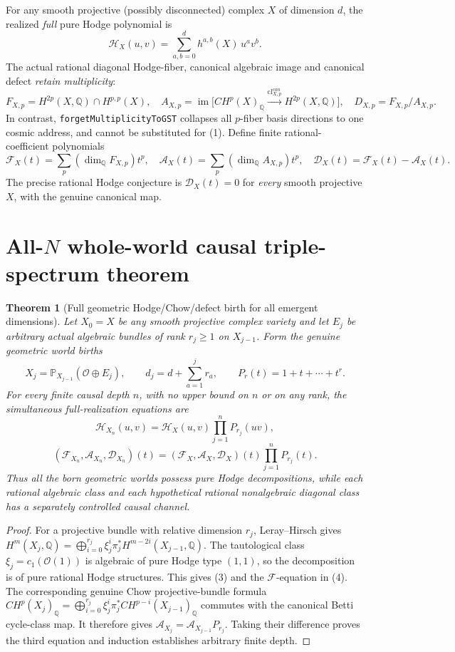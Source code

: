 \documentclass[11pt]{article}
\newtheorem{theorem}{Theorem}
\begin{document}
For any smooth projective (possibly disconnected) complex \(X\) of
dimension \(d\), the realized \emph{full} pure Hodge polynomial is
\[
 \mathcal H_X(u,v)=\sum_{a,b=0}^d h^{a,b}(X)\,u^av^b.
\]
The actual rational diagonal Hodge-fiber, canonical algebraic image
and canonical defect \emph{retain multiplicity}:
\[
 F_{X,p}=H^{2p}(X,\mathbb Q)\cap H^{p,p}(X),\quad
 A_{X,p}=\operatorname{im}\bigl[
 CH^p(X)_{\mathbb Q}\xrightarrow{\mathrm{cl}^{can}_{X,p}}
 H^{2p}(X,\mathbb Q)\bigr],\quad
 D_{X,p}=F_{X,p}/A_{X,p}.
 \tag{1}
\]
In contrast, \texttt{forgetMultiplicityToGST} collapses all \(p\)-fiber
basis directions to one cosmic address, and cannot be substituted for (1).
Define finite rational-coefficient polynomials
\[
 \mathcal F_X(t)=\sum_p(\dim_{\mathbb Q} F_{X,p})t^p,\quad
 \mathcal A_X(t)=\sum_p(\dim_{\mathbb Q} A_{X,p})t^p,\quad
 \mathcal D_X(t)=\mathcal F_X(t)-\mathcal A_X(t).
 \tag{2}
\]
The precise rational Hodge conjecture is \(\mathcal D_X(t)=0\) for
\emph{every} smooth projective \(X\), with the genuine canonical map.

\section{All-\(N\) whole-world causal triple-spectrum theorem}
\begin{theorem}[Full geometric Hodge/Chow/defect birth for all emergent dimensions]
Let \(X_0=X\) be any smooth projective complex variety and let
\(E_j\) be \emph{arbitrary actual algebraic} bundles of rank \(r_j\ge1\)
on \(X_{j-1}\). Form the genuine geometric world births
\[
 X_j=\mathbb P_{X_{j-1}}(\mathcal O\oplus E_j),
 \qquad d_j=d+\sum_{a=1}^jr_a,\qquad
 P_r(t)=1+t+\cdots+t^r.
\]
For every finite causal depth \(n\), with no upper bound on \(n\)
or on any rank, the \emph{simultaneous full-realization equations} are
\[
 \boxed{\mathcal H_{X_n}(u,v)=
       \mathcal H_X(u,v)\prod_{j=1}^n P_{r_j}(uv)},              \tag{3}
\]
\[
 \boxed{(\mathcal F_{X_n},\mathcal A_{X_n},\mathcal D_{X_n})(t)=
  (\mathcal F_X,\mathcal A_X,\mathcal D_X)(t)
           \prod_{j=1}^nP_{r_j}(t).}                          \tag{4}
\]
Thus all the born geometric worlds possess pure Hodge
decompositions, while each rational algebraic class and each
hypothetical rational nonalgebraic diagonal class has a
separately controlled causal channel.
\end{theorem}
\begin{proof}
For a projective bundle with relative dimension \(r_j\),
Leray--Hirsch gives
\(H^m(X_j,\mathbb Q)=
 \bigoplus_{i=0}^{r_j}\xi_j^i\pi_j^* H^{m-2i}(X_{j-1},\mathbb Q)\).
The tautological class \(\xi_j=c_1(\mathcal O(1))\) is algebraic
of pure Hodge type \((1,1)\), so the decomposition is of
pure rational Hodge structures. This gives (3) and the
\(\mathcal F\)-equation in (4). The corresponding genuine
Chow projective-bundle formula
\(CH^p(X_j)_{\mathbb Q}=
 \bigoplus_{i=0}^{r_j}\xi_j^i\pi_j^*CH^{p-i}(X_{j-1})_{\mathbb Q}\)
commutes with the canonical Betti cycle-class map.
It therefore gives \(\mathcal A_{X_j}=\mathcal A_{X_{j-1}}P_{r_j}\).
Taking their difference proves the third equation and induction
establishes arbitrary finite depth.
\end{proof}
\end{document}
